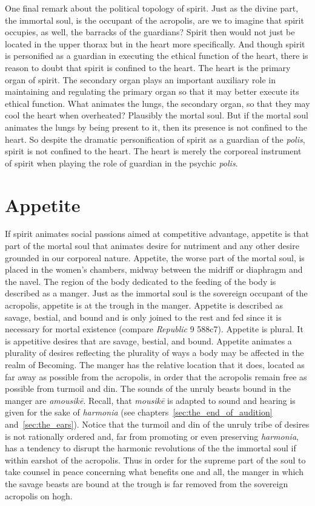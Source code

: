 One final remark about the political topology of spirit. Just as the divine part, the immortal soul, is the occupant of the acropolis, are we to imagine that spirit occupies, as well, the barracks of the guardians? Spirit then would not just be located in the upper thorax but in the heart more specifically. And though spirit is personified as a guardian in executing the ethical function of the heart, there is reason to doubt that spirit is confined to the heart. The heart is the primary organ of spirit. The secondary organ plays an important auxiliary role in maintaining and regulating the primary organ so that it may better execute its ethical function. What animates the lungs, the secondary organ, so that they may cool the heart when overheated? Plausibly the mortal soul. But if the mortal soul animates the lungs by being present to it, then its presence is not confined to the heart. So despite the dramatic personification of spirit as a guardian of the \emph{polis}, spirit is not confined to the heart. The heart is merely the corporeal instrument of spirit when playing the role of guardian in the psychic \emph{polis}.


\section{Appetite} %
\label{sec:appetite}

If spirit animates social passions aimed at competitive advantage, appetite is that part of the mortal soul that animates desire for nutriment and any other desire grounded in our corporeal nature. Appetite, the worse part of the mortal soul, is placed in the women's chambers, midway between the midriff or diaphragm and the navel. The region of the body dedicated to the feeding of the body is described as a manger. Just as the immortal soul is the sovereign occupant of the acropolis, appetite is at the trough in the manger. Appetite is described as savage, bestial, and bound and is only joined to the rest and fed since it is necessary for mortal existence (compare \emph{Republic} 9 588c7). Appetite is plural. It is appetitive desires that are savage, bestial, and bound. Appetite animates a plurality of desires reflecting the plurality of ways a body may be affected in the realm of Becoming. The manger has the relative location that it does, located as far away as possible from the acropolis, in order that the acropolis remain free as possible from turmoil and din. The sounds of the unruly beasts bound in the manger are \emph{amousikē}. Recall, that \emph{mousikē} is adapted to sound and hearing is given for the sake of \emph{harmonia} (see chapters~\ref{sec:the_end_of_audition} and~\ref{sec:the_ears}). Notice that the turmoil and din of the unruly tribe of desires is not rationally ordered and, far from promoting or even preserving \emph{harmonia}, has a tendency to disrupt the harmonic revolutions of the the immortal soul if within earshot of the acropolis. Thus in order for the supreme part of the soul to take counsel in peace concerning what benefits one and all, the manger in which the savage beasts are bound at the trough is far removed from the sovereign acropolis on hogh.

